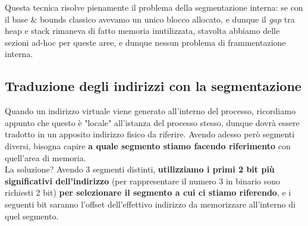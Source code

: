 \documentclass[12pt]{report}
\begin{document}
	Questa tecnica risolve pienamente il problema della segmentazione interna: se con il base \& bounds classico avevamo un unico blocco allocato, e dunque il \textit{gap} tra heap e stack rimaneva di fatto memoria inutilizzata, stavolta abbiamo delle sezioni ad-hoc per queste aree, e dunque nessun problema di frammentazione interna.
	
	\subsection{Traduzione degli indirizzi con la segmentazione}
	Quando un indirizzo virtuale viene generato all'interno del processo, ricordiamo appunto che questo è "locale" all'istanza del processo stesso, dunque dovrà essere tradotto in un apposito indirizzo fisico da riferire. Avendo adesso però segmenti diversi, bisogna capire \textbf{a quale segmento stiamo facendo riferimento} con quell'area di memoria.\\
	La soluzione? Avendo 3 segmenti distinti, \textbf{utilizziamo i primi 2 bit più significativi dell'indirizzo} (per rappresentare il numero 3 in binario sono richiesti 2 bit) \textbf{per selezionare il segmento a cui ci stiamo riferendo}, e i seguenti bit saranno l'offset dell'effettivo indirizzo da memorizzare all'interno di quel segmento.
	
\end{document}
